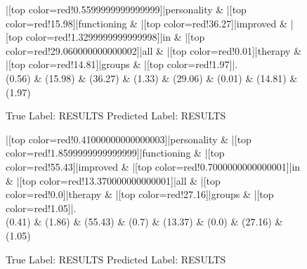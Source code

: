 \documentclass[a4paper, landscape]{article}
\begin{document}
\clearpage
\begin{figure}
\begin{center}
\begin{dependency}
\begin{deptext}
|[top color=red!0.5599999999999999]|personality \& |[top color=red!15.98]|functioning \& |[top color=red!36.27]|improved \& |[top color=red!1.3299999999999998]|in \& |[top color=red!29.060000000000002]|all \& |[top color=red!0.01]|therapy \& |[top color=red!14.81]|groups \& |[top color=red!1.97]|.\\
(0.56) \& (15.98) \& (36.27) \& (1.33) \& (29.06) \& (0.01) \& (14.81) \& (1.97)\\
\end{deptext}
\end{dependency}
\end{center}
\caption{True Label: RESULTS Predicted Label: RESULTS}
\end{figure}
\clearpage
\begin{figure}
\begin{center}
\begin{dependency}
\begin{deptext}
|[top color=red!0.41000000000000003]|personality \& |[top color=red!1.8599999999999999]|functioning \& |[top color=red!55.43]|improved \& |[top color=red!0.7000000000000001]|in \& |[top color=red!13.370000000000001]|all \& |[top color=red!0.0]|therapy \& |[top color=red!27.16]|groups \& |[top color=red!1.05]|.\\
(0.41) \& (1.86) \& (55.43) \& (0.7) \& (13.37) \& (0.0) \& (27.16) \& (1.05)\\
\end{deptext}
\end{dependency}
\end{center}
\caption{True Label: RESULTS Predicted Label: RESULTS}
\end{figure}
\clearpage
\end{document}
